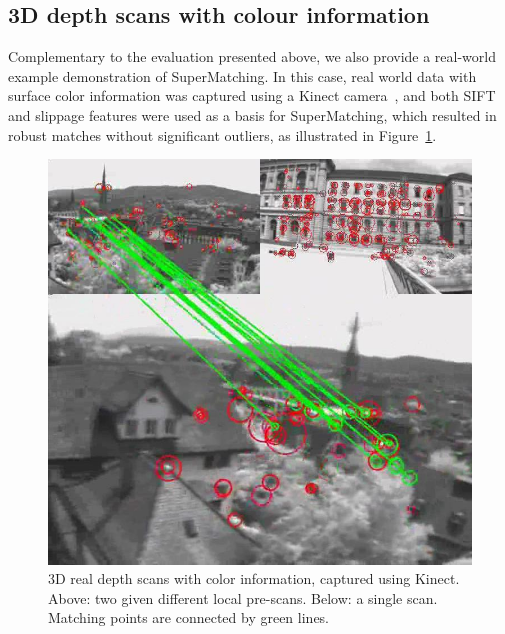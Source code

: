 \subsection{3D depth scans with colour information}
\label{subsec:3dColored}

Complementary to the evaluation presented above,
we also provide a real-world example demonstration of SuperMatching. In this case,
real world data with surface color information was captured using a Kinect camera~\cite{Kinect12}, and both SIFT and slippage features were used as a basis for SuperMatching, 
which resulted in robust matches without significant outliers, as illustrated in Figure~\ref{fig:3DReal}.
\begin{figure}
\centering
  \includegraphics[width=0.98\linewidth]{figures/3DReal.jpg}
  \caption{3D real depth scans with color information, captured using Kinect.
  Above: two given different local pre-scans.  Below: a single scan.
  Matching points are connected by  green lines.}
\label{fig:3DReal}
\end{figure}
